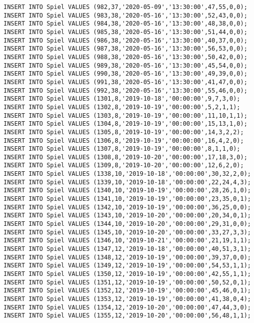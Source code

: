 \documentclass{bschlangaul-aufgabe}
\begin{document}
\begin{verbatim}
INSERT INTO Spiel VALUES (982,37,'2020-05-09','13:30:00',47,55,0,0);
INSERT INTO Spiel VALUES (983,38,'2020-05-16','13:30:00',52,43,0,0);
INSERT INTO Spiel VALUES (984,38,'2020-05-16','13:30:00',48,38,0,0);
INSERT INTO Spiel VALUES (985,38,'2020-05-16','13:30:00',51,44,0,0);
INSERT INTO Spiel VALUES (986,38,'2020-05-16','13:30:00',40,37,0,0);
INSERT INTO Spiel VALUES (987,38,'2020-05-16','13:30:00',56,53,0,0);
INSERT INTO Spiel VALUES (988,38,'2020-05-16','13:30:00',50,42,0,0);
INSERT INTO Spiel VALUES (989,38,'2020-05-16','13:30:00',45,54,0,0);
INSERT INTO Spiel VALUES (990,38,'2020-05-16','13:30:00',49,39,0,0);
INSERT INTO Spiel VALUES (991,38,'2020-05-16','13:30:00',41,47,0,0);
INSERT INTO Spiel VALUES (992,38,'2020-05-16','13:30:00',55,46,0,0);
INSERT INTO Spiel VALUES (1301,8,'2019-10-18','00:00:00',9,7,3,0);
INSERT INTO Spiel VALUES (1302,8,'2019-10-19','00:00:00',5,2,1,1);
INSERT INTO Spiel VALUES (1303,8,'2019-10-19','00:00:00',11,10,1,1);
INSERT INTO Spiel VALUES (1304,8,'2019-10-19','00:00:00',15,13,1,0);
INSERT INTO Spiel VALUES (1305,8,'2019-10-19','00:00:00',14,3,2,2);
INSERT INTO Spiel VALUES (1306,8,'2019-10-19','00:00:00',16,4,2,0);
INSERT INTO Spiel VALUES (1307,8,'2019-10-19','00:00:00',8,1,1,0);
INSERT INTO Spiel VALUES (1308,8,'2019-10-20','00:00:00',17,18,3,0);
INSERT INTO Spiel VALUES (1309,8,'2019-10-20','00:00:00',12,6,2,0);
INSERT INTO Spiel VALUES (1338,10,'2019-10-18','00:00:00',30,32,2,0);
INSERT INTO Spiel VALUES (1339,10,'2019-10-18','00:00:00',22,24,4,3);
INSERT INTO Spiel VALUES (1340,10,'2019-10-19','00:00:00',28,26,1,0);
INSERT INTO Spiel VALUES (1341,10,'2019-10-19','00:00:00',23,35,0,1);
INSERT INTO Spiel VALUES (1342,10,'2019-10-19','00:00:00',36,25,0,0);
INSERT INTO Spiel VALUES (1343,10,'2019-10-20','00:00:00',20,34,0,1);
INSERT INTO Spiel VALUES (1344,10,'2019-10-20','00:00:00',29,31,0,0);
INSERT INTO Spiel VALUES (1345,10,'2019-10-20','00:00:00',33,27,3,3);
INSERT INTO Spiel VALUES (1346,10,'2019-10-21','00:00:00',21,19,1,1);
INSERT INTO Spiel VALUES (1347,12,'2019-10-18','00:00:00',40,51,3,1);
INSERT INTO Spiel VALUES (1348,12,'2019-10-19','00:00:00',39,37,0,0);
INSERT INTO Spiel VALUES (1349,12,'2019-10-19','00:00:00',54,53,1,1);
INSERT INTO Spiel VALUES (1350,12,'2019-10-19','00:00:00',42,55,1,1);
INSERT INTO Spiel VALUES (1351,12,'2019-10-19','00:00:00',50,52,0,1);
INSERT INTO Spiel VALUES (1352,12,'2019-10-19','00:00:00',45,46,0,1);
INSERT INTO Spiel VALUES (1353,12,'2019-10-19','00:00:00',41,38,0,4);
INSERT INTO Spiel VALUES (1354,12,'2019-10-20','00:00:00',47,44,3,0);
INSERT INTO Spiel VALUES (1355,12,'2019-10-20','00:00:00',56,48,1,1);

\end{verbatim}
\end{document}

